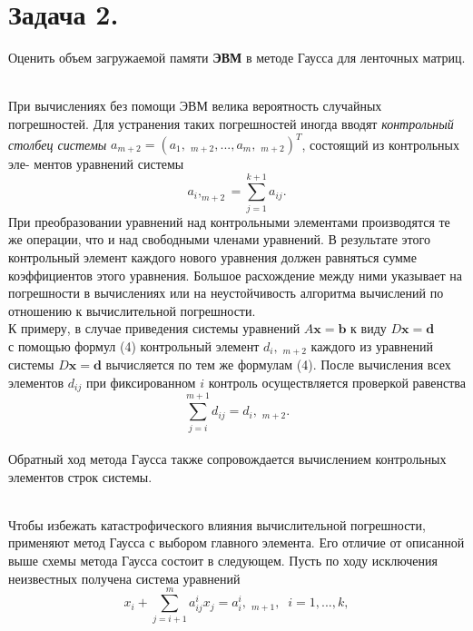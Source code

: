\documentclass[a4paper, twoside, 12pt]{article}
\begin{document}
\chapter{\textbf{Задача 2.}}
Оценить объем загружаемой памяти \textbf{ЭВМ} в методе Гаусса для ленточных матриц.
\\ \\ 
\begin{adjustwidth}{1cm}{0cm}
    \small
   При вычислениях без помощи ЭВМ велика вероятность случайных погрешностей. Для устранения таких погрешностей иногда вводят \textit{контрольный столбец системы} $a_{m+2} = (a_{1}, \; _{m+2}, ..., a_{m}, \; _{ m+2})^T$, состоящий из контрольных эле- ментов уравнений системы
   \[ a_{i}, _{m+2} =  \sum_{j=1}^{k+1} a_{ij}.\]
   При преобразовании уравнений над контрольными элементами производятся те же операции, что и над свободными членами уравнений. В результате этого контрольный элемент каждого нового уравнения должен равняться сумме коэффициентов этого уравнения. Большое расхождение между ними указывает на погрешности в вычислениях или на неустойчивость алгоритма вычислений по отношению к вычислительной погрешности.
   \\ 
   К примеру, в случае приведения системы уравнений $A \textbf{x} = \textbf{b}$ к виду $D \textbf{x} = \textbf{d}$ \\
   с помощью формул (4) контрольный элемент $d_{i}, \; _{m+2}$ каждого из уравнений системы $D \textbf{x} = \textbf{d}$ вычисляется по тем же формулам (4). После вычисления всех элементов $d_{ij}$ при фиксированном $i$ контроль осуществляется проверкой равенства
    \[\sum_{j=i}^{m+1} d_{ij} = d_{i}, \; _{m+2}.\]
    \\ 
    Обратный ход метода Гаусса также сопровождается вычислением контрольных элементов строк системы.
\end{adjustwidth} 
\\ 
Чтобы избежать катастрофического влияния вычислительной погрешности, применяют метод Гаусса с выбором главного элемента. Его отличие
от описанной выше схемы метода Гаусса состоит в следующем. Пусть по
ходу исключения неизвестных получена система уравнений
\[ x_{i} + \sum_{j=i + 1}^{m} a_{ij}^ix_{j} = a_{i}^i, \; _{m+1},\; \; i = 1, ..., k,  \]
\end{document}
